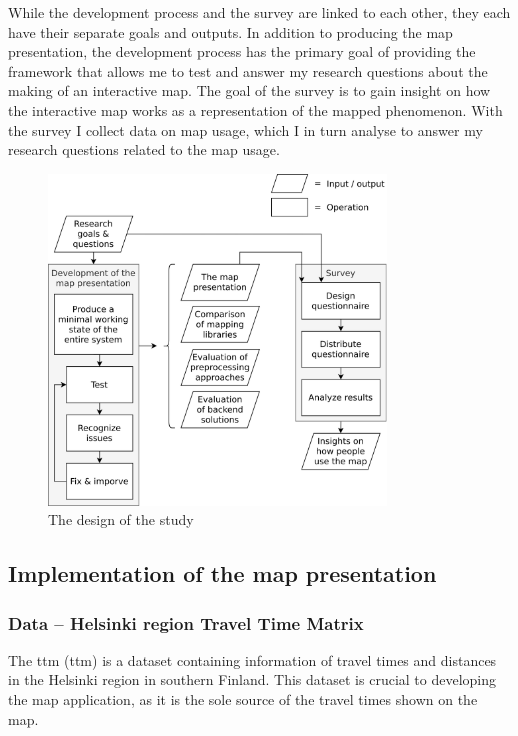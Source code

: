 While the development process and the survey are linked to each other,
they each have their separate goals and outputs.
In addition to producing the map presentation,
the development process has the primary goal of providing the framework
that allows me to test and answer my research questions
about the making of an interactive map.
The goal of the survey is to gain insight on
how the interactive map works as a representation of the mapped phenomenon.
With the survey I collect data on map usage,
which I in turn analyse to answer my research questions related to the map usage.

\begin{figure}[H]
	\centering
	\includegraphics[width=0.8\textwidth]{visual/figures/diagrams/study_design.png}
	\caption{The design of the study}
	\label{fig:study design}
\end{figure}

\subsection{Implementation of the map presentation}

\subsubsection{Data -- Helsinki region Travel Time Matrix}

The \acrlong{ttm} (\acrshort{ttm}) \parencite{fin2023}
is a dataset containing information of travel times and distances
in the Helsinki region in southern Finland.
This dataset is crucial to developing the map application,
as it is the sole source of the travel times shown on the map.

